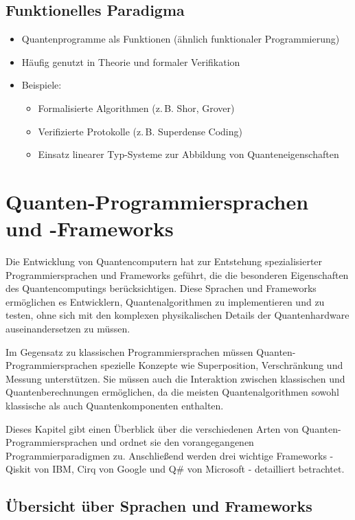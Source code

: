 \subsection{Funktionelles Paradigma}
\begin{itemize}
    \item Quantenprogramme als Funktionen (ähnlich funktionaler Programmierung)
    \item Häufig genutzt in Theorie und formaler Verifikation
    \item Beispiele: 
    \begin{itemize}
        \item Formalisierte Algorithmen (z.\,B. Shor, Grover)
        \item Verifizierte Protokolle (z.\,B. Superdense Coding)
        \item Einsatz linearer Typ-Systeme zur Abbildung von Quanteneigenschaften
    \end{itemize}
\end{itemize}

\section{Quanten-Programmiersprachen und -Frameworks}
\label{sec:programming-languages}


Die Entwicklung von Quantencomputern hat zur Entstehung spezialisierter Programmiersprachen und Frameworks geführt, die die besonderen Eigenschaften des Quantencomputings berücksichtigen. Diese Sprachen und Frameworks ermöglichen es Entwicklern, Quantenalgorithmen zu implementieren und zu testen, ohne sich mit den komplexen physikalischen Details der Quantenhardware auseinandersetzen zu müssen.

Im Gegensatz zu klassischen Programmiersprachen müssen Quanten-Programmiersprachen spezielle Konzepte wie Superposition, Verschränkung und Messung unterstützen. Sie müssen auch die Interaktion zwischen klassischen und Quantenberechnungen ermöglichen, da die meisten Quantenalgorithmen sowohl klassische als auch Quantenkomponenten enthalten.

Dieses Kapitel gibt einen Überblick über die verschiedenen Arten von Quanten-Programmiersprachen und ordnet sie den vorangegangenen Programmierparadigmen zu. Anschließend werden drei wichtige Frameworks - Qiskit von IBM, Cirq von Google und Q\# von Microsoft - detailliert betrachtet.

\subsection{Übersicht über Sprachen und Frameworks}


